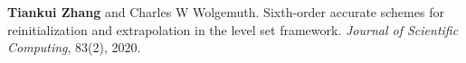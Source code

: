 
\begin{cventries}
  \cventry
    {} %
    {} %
    {} %
    {} %
    {
      \begin{cvitems} %
        \item {\textbf{Tiankui Zhang} and Charles W Wolgemuth. Sixth-order accurate schemes for reinitialization
and extrapolation in the level set framework. \textit{Journal of Scientific Computing}, 83(2), 2020.}
      \end{cvitems}
    }


\end{cventries}